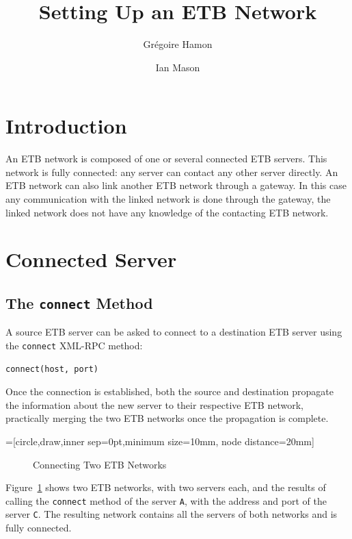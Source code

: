 \documentclass{article}
\title{Setting Up an ETB Network}
\author{Gr\'egoire Hamon}
\author{Ian Mason}
\begin{document}
\maketitle

\section{Introduction}

An ETB network is composed of one or several connected ETB servers.
This network is fully connected: any server can contact any other
server directly. An ETB network can also link another ETB network
through a gateway. In this case any communication with the linked
network is done through the gateway, the linked network does not have
any knowledge of the contacting ETB network.

\section{Connected Server}

\subsection{The {\tt connect} Method}

A source ETB server can be asked to connect to a destination ETB
server using the {\tt connect} XML-RPC method:
\begin{verbatim}
connect(host, port)
\end{verbatim}
Once the connection is established, both the source and destination
propagate the information about the new server to their respective ETB
network, practically merging the two ETB networks once the propagation
is complete.

=[circle,draw,inner sep=0pt,minimum size=10mm, node distance=20mm]

\begin{figure}[h]
\caption{Connecting Two ETB Networks}
\label{fig:connect}
\end{figure}
Figure~\ref{fig:connect} shows two ETB networks, with two servers
each, and the results of calling the {\tt connect} method of the
server {\tt A}, with the address and port of the server {\tt C}. The
resulting network contains all the servers of both networks and is
fully connected.
\end{document}
